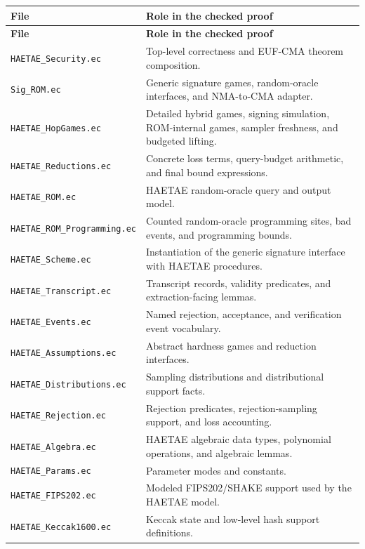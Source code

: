 \documentclass[11pt]{article}
\newcommand{\file}[1]{\nolinkurl{#1}}
\newcommand{\eufcma}{EUF-CMA}
\begin{document}
\begin{longtable}{p{}p{}}
\toprule
\textbf{File} & \textbf{Role in the checked proof} \\
\midrule
\endfirsthead
\toprule
\textbf{File} & \textbf{Role in the checked proof} \\
\midrule
\endhead
\file{HAETAE_Security.ec} &
Top-level correctness and \eufcma{} theorem composition. \\
\file{Sig_ROM.ec} &
Generic signature games, random-oracle interfaces, and NMA-to-CMA adapter. \\
\file{HAETAE_HopGames.ec} &
Detailed hybrid games, signing simulation, ROM-internal games, sampler
freshness, and budgeted lifting. \\
\file{HAETAE_Reductions.ec} &
Concrete loss terms, query-budget arithmetic, and final bound expressions. \\
\file{HAETAE_ROM.ec} &
HAETAE random-oracle query and output model. \\
\file{HAETAE_ROM_Programming.ec} &
Counted random-oracle programming sites, bad events, and programming bounds. \\
\file{HAETAE_Scheme.ec} &
Instantiation of the generic signature interface with HAETAE procedures. \\
\file{HAETAE_Transcript.ec} &
Transcript records, validity predicates, and extraction-facing lemmas. \\
\file{HAETAE_Events.ec} &
Named rejection, acceptance, and verification event vocabulary. \\
\file{HAETAE_Assumptions.ec} &
Abstract hardness games and reduction interfaces. \\
\file{HAETAE_Distributions.ec} &
Sampling distributions and distributional support facts. \\
\file{HAETAE_Rejection.ec} &
Rejection predicates, rejection-sampling support, and loss accounting. \\
\file{HAETAE_Algebra.ec} &
HAETAE algebraic data types, polynomial operations, and algebraic lemmas. \\
\file{HAETAE_Params.ec} &
Parameter modes and constants. \\
\file{HAETAE_FIPS202.ec} &
Modeled FIPS202/SHAKE support used by the HAETAE model. \\
\file{HAETAE_Keccak1600.ec} &
Keccak state and low-level hash support definitions. \\
\bottomrule
\end{longtable}
\end{document}
